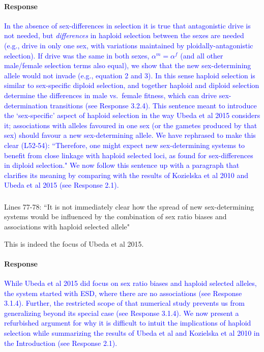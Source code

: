 \documentclass[10pt,letterpaper]{article}
\begin{document}
\noindent\paragraph{Response}
\textcolor{blue}{In the absence of sex-differences in selection it is true that antagonistic drive is not needed, but \textit{differences} in haploid selection between the sexes are needed (e.g., drive in only one sex, with variations maintained by ploidally-antagonistic selection). 
If drive was the same in both sexes, $\alpha^{m}=\alpha^{f}$ (and all other male/female selection terms also equal), we show that the new sex-determining allele would not invade (e.g., equation 2 and 3). 
In this sense haploid selection is similar to sex-specific diploid selection, and together haploid and diploid selection determine the differences in male vs.\ female fitness, which can drive sex-determination transitions (see Response 3.2.4).
This sentence meant to introduce the `sex-specific' aspect of haploid selection in the way Ubeda et al 2015 considers it; associations with alleles favoured in one sex (or the gametes produced by that sex) should favour a new sex-determining allele.
We have rephrased to make this clear (L52-54): ``Therefore, one might expect new sex-determining systems to benefit from close linkage with haploid selected loci, as found for sex-differences in diploid selection."
We now follow this sentence up with a paragraph that clarifies its meaning by comparing with the results of Kozielska et al 2010 and Ubeda et al 2015 (see Response 2.1).}

\noindent\subsubsection{}
Lines 77-78: ``It is not immediately clear how the spread of new sex-determining systems would be influenced by the combination of sex ratio biases and associations with haploid selected allele"

This is indeed the focus of Ubeda et al 2015.

\noindent\paragraph{Response}
\textcolor{blue}{While Ubeda et al 2015 did focus on sex ratio biases and haploid selected alleles, the system started with ESD, where there are no associations (see Response 3.1.4).
Further, the restricted scope of that numerical study prevents us from generalizing beyond its special case (see Response 3.1.4).
We now present a refurbished argument for why it is difficult to intuit the implications of haploid selection while summarizing the results of Ubeda et al and Kozielska et al 2010 in the Introduction (see Response 2.1).
}
\end{document}
